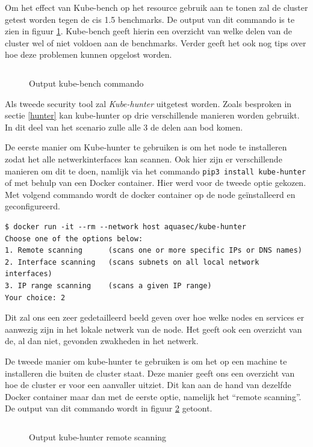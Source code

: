 Om het effect van Kube-bench op het resource gebruik aan te tonen zal de cluster getest worden tegen de cis 1.5 benchmarks. De output van dit commando is te zien in figuur \ref{benchOut}. Kube-bench geeft hierin een overzicht van welke delen van de cluster wel of niet voldoen aan de benchmarks. Verder geeft het ook nog tips over hoe deze problemen kunnen opgelost worden.

\begin{figure}[h] 
	\centering
	\inputminted[fontsize=\footnotesize,linenos]{bash}{files/benchOutput.txt}
	\caption{Output kube-bench commando}
	\label{benchOut}
\end{figure}

Als tweede security tool zal \textit{Kube-hunter} uitgetest worden. Zoals besproken in sectie \ref{hunter} kan kube-hunter op drie verschillende manieren worden gebruikt. In dit deel van het scenario zulle alle 3 de delen aan bod komen.

De eerste manier om Kube-hunter te gebruiken is om het node te installeren zodat het alle netwerkinterfaces kan scannen. Ook hier zijn er verschillende manieren om dit te doen, namlijk via het commando \verb|pip3 install kube-hunter| of met behulp van een Docker container. Hier werd voor de tweede optie gekozen. Met volgend commando wordt de docker container op de node geïnstalleerd en geconfigureerd.
\begin{verbatim} 
$ docker run -it --rm --network host aquasec/kube-hunter
Choose one of the options below:
1. Remote scanning      (scans one or more specific IPs or DNS names)
2. Interface scanning   (scans subnets on all local network interfaces)
3. IP range scanning    (scans a given IP range)
Your choice: 2
\end{verbatim}
Dit zal ons een zeer gedetailleerd beeld geven over hoe welke nodes en services er aanwezig zijn in het lokale netwerk van de node. Het geeft ook een overzicht van de, al dan niet, gevonden zwakheden in het netwerk.

De tweede manier om kube-hunter te gebruiken is om het op een machine te installeren die buiten de cluster staat. Deze manier geeft ons een overzicht van hoe de cluster er voor een aanvaller uitziet. Dit kan aan de hand van dezelfde Docker container maar dan met de eerste optie, namelijk het ``remote scanning''. De output van dit commando wordt in figuur \ref{remoteHunt} getoont.

\begin{figure}[h] 
	\centering
	\inputminted[fontsize=\footnotesize,linenos]{bash}{files/hunterRemoteOutput.txt}
	\caption{Output kube-hunter remote scanning}
	\label{remoteHunt}
\end{figure}


